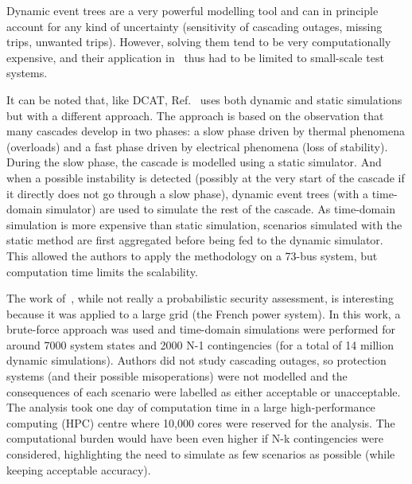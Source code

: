 
Dynamic event trees are a very powerful modelling tool and can in principle account for any kind of uncertainty (sensitivity of cascading outages, missing trips, unwanted trips). However, solving them tend to be very computationally expensive, and their application in~\cite{TwoLevelPSA, Faghihi, PierreMCDETprelim} thus had to be limited to small-scale test systems.


It can be noted that, like DCAT, Ref.~\cite{TwoLevelPSA} uses both dynamic and static simulations but with a different approach. The approach is based on the observation that many cascades develop in two phases: a slow phase driven by thermal phenomena (overloads) and a fast phase driven by electrical phenomena (loss of stability). During the slow phase, the cascade is modelled using a static simulator. And when a possible instability is detected (possibly at the very start of the cascade if it directly does not go through a slow phase), dynamic event trees (with a time-domain simulator) are used to simulate the rest of the cascade. As time-domain simulation is more expensive than static simulation, scenarios simulated with the static method are first aggregated before being fed to the dynamic simulator. This allowed the authors to apply the methodology on a 73-bus system, but computation time limits the scalability.

The work of~\cite{EurostagHPC}, while not really a probabilistic security assessment, is interesting because it was applied to a large grid (the French power system). In this work, a brute-force approach was used and time-domain simulations were performed for around 7000 system states and 2000 N-1 contingencies (for a total of 14 million dynamic simulations). Authors did not study cascading outages, so protection systems (and their possible misoperations) were not modelled and the consequences of each scenario were labelled as either acceptable or unacceptable. The analysis took one day of computation time in a large high-performance computing (HPC) centre where 10,000 cores were reserved for the analysis. The computational burden would have been even higher if N-k contingencies were considered, highlighting the need to simulate as few scenarios as possible (while keeping acceptable accuracy).


